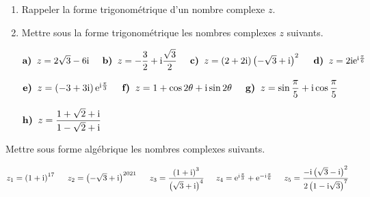 
\everymath{\displaystyle}



\begin{exercice}
\begin{enumerate}
\item Rappeler la forme trigonométrique d'un nombre complexe $ z $.
\item Mettre  sous la  forme trigonométrique les nombres complexes $ z $ suivants.

 $\textbf{a)} \;\;z=2\sqrt{3}-6\text{i}
\hspace*{0.5cm}\textbf{b)} \;\;  z=-\dfrac{3}{2}+\text{i}\dfrac{\sqrt{3}}{2} \hspace*{0.5cm}\textbf{c)} \;\; z=\left(2+2\text{i}\right)\left(-\sqrt{3}+\text{i}\right)^2
\hspace*{0.5cm}\textbf{d)} \;\; z=2\text{i}\mathrm{e}^{\text{i}\frac{\pi}{6}} $
\medskip

 $\textbf{e)} \;\;z=\left(-3+3\text{i}\right)\mathrm{e}^{\text{i}\frac{\pi}{3}}
\hspace*{0.5cm}\textbf{f)} \;\;  z=1+\cos 2\theta +\text{i}\sin 2\theta \hspace*{0.5cm}\textbf{g)} \;\; z=\sin \dfrac{\pi}{5} +\text{i}\cos \dfrac{\pi}{5}$

$\textbf{h)} \;\; z=\dfrac{1+\sqrt{2}+\text{i}}{1-\sqrt{2}+\text{i}} $

\end{enumerate}
\end{exercice}

\begin{exercice}
Mettre sous forme algébrique les nombres complexes suivants.
\medskip

 $  z_1=\left(1+\text{i}\right)^{17}
\hspace*{0.5cm}  z_2=\left(-\sqrt{3}+\text{i}\right)^{2021}  \hspace*{0.5cm}  z_3=\dfrac{\left(1+\text{i}\right)^{3}}{\left(\sqrt{3}+\text{i}\right)^{4}} \hspace*{0.5cm} z_4=\mathrm{e}^{\text{i}\frac{\pi}{3}}+\mathrm{e}^{-\text{i}\frac{\pi}{6}} \hspace*{0.5cm} z_5=\dfrac{-\text{i}\left(\sqrt{3}-\text{i}\right)^{2}}{2\left(1-\text{i}\sqrt{3}\right)^{7}}$

\end{exercice}



